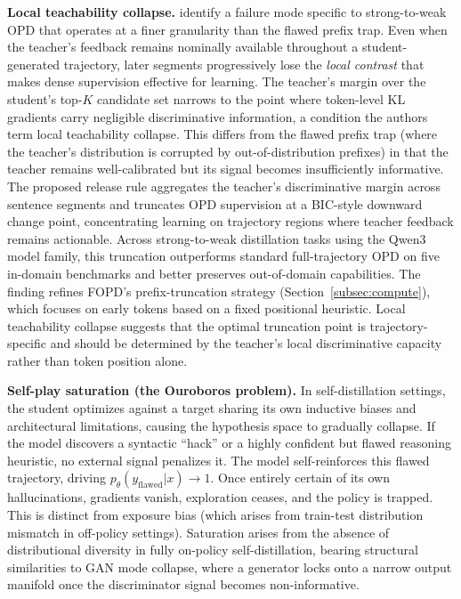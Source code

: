 \documentclass{article} %
\newcommand{\ptheta}{p_\theta}
\begin{document}
\textbf{Local teachability collapse.} \citet{2605.13643} identify a failure mode specific to strong-to-weak OPD that operates at a finer granularity than the flawed prefix trap. Even when the teacher's feedback remains nominally available throughout a student-generated trajectory, later segments progressively lose the \emph{local contrast} that makes dense supervision effective for learning. The teacher's margin over the student's top-$K$ candidate set narrows to the point where token-level KL gradients carry negligible discriminative information, a condition the authors term local teachability collapse. This differs from the flawed prefix trap (where the teacher's distribution is corrupted by out-of-distribution prefixes) in that the teacher remains well-calibrated but its signal becomes insufficiently informative. The proposed release rule aggregates the teacher's discriminative margin across sentence segments and truncates OPD supervision at a BIC-style downward change point, concentrating learning on trajectory regions where teacher feedback remains actionable. Across strong-to-weak distillation tasks using the Qwen3 model family, this truncation outperforms standard full-trajectory OPD on five in-domain benchmarks and better preserves out-of-domain capabilities. The finding refines FOPD's prefix-truncation strategy (Section~\ref{subsec:compute}), which focuses on early tokens based on a fixed positional heuristic. Local teachability collapse suggests that the optimal truncation point is trajectory-specific and should be determined by the teacher's local discriminative capacity rather than token position alone.

\textbf{Self-play saturation (the Ouroboros problem).} In self-distillation settings, the student optimizes against a target sharing its own inductive biases and architectural limitations, causing the hypothesis space to gradually collapse. If the model discovers a syntactic ``hack'' or a highly confident but flawed reasoning heuristic, no external signal penalizes it. The model self-reinforces this flawed trajectory, driving $\ptheta(y_{\text{flawed}}|x) \to 1$. Once entirely certain of its own hallucinations, gradients vanish, exploration ceases, and the policy is trapped. This is distinct from exposure bias (which arises from train-test distribution mismatch in off-policy settings). Saturation arises from the absence of distributional diversity in fully on-policy self-distillation, bearing structural similarities to GAN mode collapse, where a generator locks onto a narrow output manifold once the discriminator signal becomes non-informative.
\end{document}

